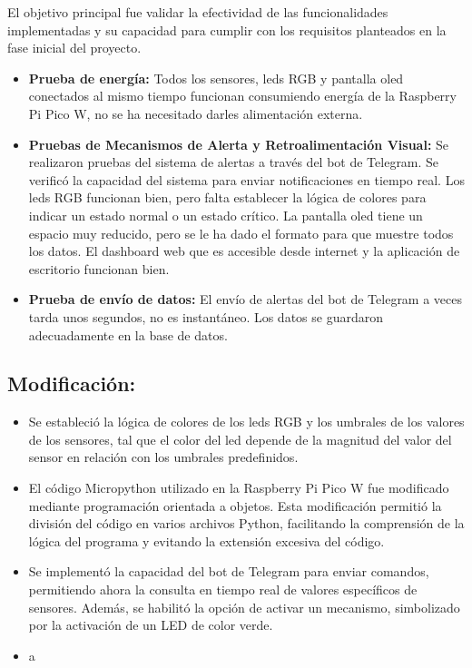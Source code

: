 El objetivo principal fue validar la efectividad de las funcionalidades implementadas y su capacidad para cumplir con los requisitos planteados en la fase inicial del proyecto.
\begin{itemize}
	\item \textbf{Prueba de energía:}
Todos los sensores, leds RGB y pantalla oled conectados al mismo tiempo funcionan consumiendo energía de la Raspberry Pi Pico W, no se ha necesitado darles alimentación externa.
	\item \textbf{Pruebas de Mecanismos de Alerta y Retroalimentación Visual:}
Se realizaron pruebas del sistema de alertas a través del bot de Telegram. Se verificó la capacidad del sistema para enviar notificaciones en tiempo real.
Los leds RGB funcionan bien, pero falta establecer la lógica de colores para indicar un estado normal o un estado crítico.
La pantalla oled tiene un espacio muy reducido, pero se le ha dado el formato para que muestre todos los datos.
El dashboard web que es accesible desde internet y la aplicación de escritorio funcionan bien.

\item \textbf{Prueba de envío de datos:}
El envío de alertas del bot de Telegram a veces tarda unos segundos, no es instantáneo.
Los datos se guardaron adecuadamente en la base de datos.
\end{itemize}
\subsection{Modificación:}
\begin{itemize}
	\item Se estableció la lógica de colores de los leds RGB y los umbrales de los valores de los sensores, tal que el color del led depende de la magnitud del valor del sensor en relación con los umbrales predefinidos.
	\item El código Micropython utilizado en la Raspberry Pi Pico W fue modificado mediante programación orientada a objetos. Esta modificación permitió la división del código en varios archivos Python, facilitando la comprensión de la lógica del programa y evitando la extensión excesiva del código.
	\item Se implementó la capacidad del bot de Telegram para enviar comandos, permitiendo ahora la consulta en tiempo real de valores específicos de sensores. Además, se habilitó la opción de activar un mecanismo, simbolizado por la activación de un LED de color verde.
	\item a
\end{itemize}

